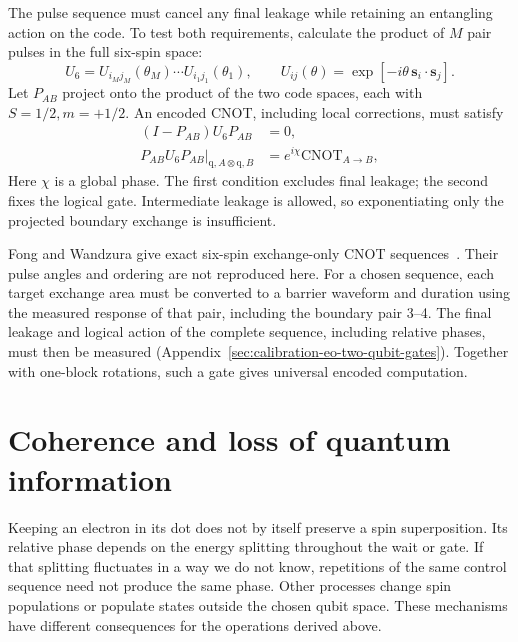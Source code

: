 The pulse sequence must cancel any final leakage while retaining
an entangling action on the code. To test both requirements,
calculate the product of $M$ pair pulses in the full six-spin space:
\begin{equation}
 U_6=U_{i_Mj_M}(\theta_M)\cdots U_{i_1j_1}(\theta_1),
 \qquad
 U_{ij}(\theta)=\exp[-i\theta\,\mathbf{s}_i\cdot\mathbf{s}_j].
 \label{eq:encoded-six-spin-sequence}
\end{equation}
Let $P_{AB}$ project onto the product of the two code spaces,
each with $S=1/2,m=+1/2$. An encoded CNOT, including local corrections,
must satisfy
\begin{equation}
 \begin{aligned}
  (I-P_{AB})U_6P_{AB}&=0,\\
  \left.P_{AB}U_6P_{AB}\right|_{\mathrm{q},A\otimes\mathrm{q},B}
      &=e^{i\chi}\mathrm{CNOT}_{A\to B},
 \end{aligned}
 \label{eq:encoded-cnot-target}
\end{equation}
Here $\chi$ is a global phase.
The first condition excludes final leakage; the second fixes the
logical gate. Intermediate leakage is allowed, so exponentiating
only the projected boundary exchange is insufficient.

Fong and Wandzura give exact six-spin exchange-only
CNOT sequences~\cite{FongWandzura2011}. Their pulse angles and
ordering are not reproduced here. For a chosen sequence, each
target exchange area must be converted to a barrier waveform and
duration using the measured response of that pair, including the
boundary pair 3--4. The final leakage and logical action of the
complete sequence, including relative phases, must then be measured
(Appendix~\ref{sec:calibration-eo-two-qubit-gates}). Together with
one-block rotations, such a gate gives universal encoded computation.

\section{Coherence and loss of quantum information}
\label{sec:platform-coherence}

Keeping an electron in its dot does not by itself preserve a spin
superposition. Its relative phase depends on the energy splitting
throughout the wait or gate. If that splitting fluctuates in a way
we do not know, repetitions of the same control sequence need not
produce the same phase. Other processes change spin populations or
populate states outside the chosen qubit space. These mechanisms
have different consequences for the operations derived above.

